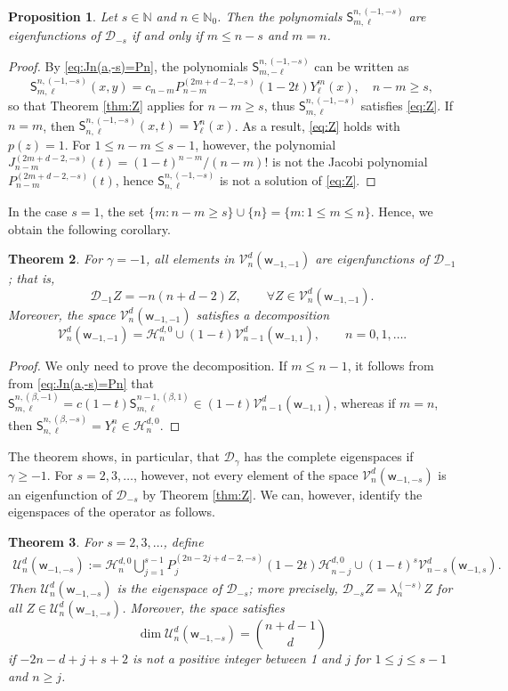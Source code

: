 \documentclass{amsart}
\newtheorem{thm}{Theorem}[section]
\newtheorem{prop}[thm]{Proposition}
\theoremstyle{remark}
\def\sw{{\mathsf w}}
\def\sS{{\mathsf S}}
\def\b{{\beta}}
\def\g{{\gamma}}
\def\CD{{\mathcal D}}
\def\CH{{\mathcal H}}
\def\CU{{\mathcal U}}
\def\CV{{\mathcal V}}
\def\NN{{\mathbb N}}
\begin{document}
\begin{prop}
Let $s \in \NN$ and $n \in \NN_0$. Then the polynomials $\sS_{m,\ell}^{n, (-1,-s)}$ are eigenfunctions
of $\CD_{-s}$ if and only if $m \le n-s$ and $m =n$.
\end{prop}

\begin{proof}
By \eqref{eq:Jn(a,-s)=Pn}, the polynomials $\sS_{m,-\ell}^{n,(-1,-s)}$ can be written as
$$
\sS_{m,\ell}^{n,(-1,-s)}(x,y) = c_{n-m} P_{n-m}^{(2m+d-2,-s)}(1-2t) Y_\ell^m(x), \quad n-m \ge s,
$$
so that Theorem \ref{thm:Z} applies for $n - m \ge s$, thus $\sS_{m,\ell}^{n, (-1,-s)}$ satisfies
\eqref{eq:Z}. If $n = m$, then $\sS_{n, \ell}^{n, (-1,-s)}(x,t) = Y_\ell^n(x)$. As a result,
\eqref{eq:Z} holds with $p(z) =1$. For $1 \le n-m \le s-1$, however, the polynomial
$J_{n-m}^{(2m+d-2,-s)}(t) = (1-t)^{n-m}/(n-m)!$ is not the Jacobi polynomial $P_{n-m}^{(2m+d-2,-s)}(t)$,
hence $\sS_{n, \ell}^{n, (-1,-s)}$ is not a solution of \eqref{eq:Z}.
\end{proof}

In the case $s =1$, the set $\{m: n -m \ge s\} \cup \{n\} = \{m: 1 \le m \le n\}$. Hence, we obtain the
following corollary.

\begin{thm}
For $\g = -1$, all elements in $\CV_n^d(\sw_{-1,-1})$ are eigenfunctions of $\CD_{-1}$; that is,
$$
   \CD_{-1} Z = - n  (n+ d-2) Z, \qquad \forall Z \in \CV_n^d(\sw_{-1,-1}).
$$
Moreover, the space $\CV_n^d(\sw_{-1,-1})$ satisfies a decomposition
$$
\CV_n^d(\sw_{-1,-1}) =  \CH_n^{d,0} \cup (1-t) \CV_{n-1}^d(\sw_{-1,1}), \qquad n =0,1,\ldots.
$$
\end{thm}

\begin{proof}
We only need to prove the decomposition. If $m \le n-1$, it follows from from \eqref{eq:Jn(a,-s)=Pn} that
$\sS_{m,\ell}^{n,(\b,-1)}  = c (1-t) \sS_{m,\ell}^{n-1,(\b,1)} \in (1-t) \CV_{n-1}^d(\sw_{-1,1})$, whereas if $m = n$,
then $\sS_{n,\ell}^{n,(\b,-s)} = Y_\ell^n \in \CH_n^{d,0}$.
\end{proof}

The theorem shows, in particular, that $\CD_{\g}$ has the complete eigenspaces if $\g \ge -1$.
For $s = 2,3,\ldots$, however, not every element of the space $\CV_n^d(\sw_{-1,-s})$ is an eigenfunction of
$\CD_{ -s}$ by Theorem \ref{thm:Z}. We can, however, identify the eigenspaces of the operator as follows.

\begin{thm}
For $s = 2,3,\ldots$, define
\begin{align*}
\CU_n^d(\sw_{-1,-s}):= \CH_{n}^{d,0}  \bigcup_{j=1}^{s-1}P_j^{(2n-2j+d-2,-s)}(1-2t)\CH_{n-j}^{d,0}
     \cup (1-t)^s \CV_{n-s}^d (\sw_{-1,s}).
\end{align*}
Then $\CU_n^d(\sw_{-1,-s})$ is the eigenspace of $\CD_{-s}$; more precisely,
$\CD_{-s} Z=\lambda_n^{(-s)}Z$ for all $Z \in \CU_n^d(\sw_{-1,-s})$. Moreover, the space satisfies
$$
  \dim \CU_n^d(\sw_{-1,-s}) = \binom{n+d-1}{d}
$$
if $-2n-d+j+s+2$ is not a positive integer between 1 and $j$ for $1 \le j \le s-1$ and $n \ge j$.
\end{thm}
\end{document}
